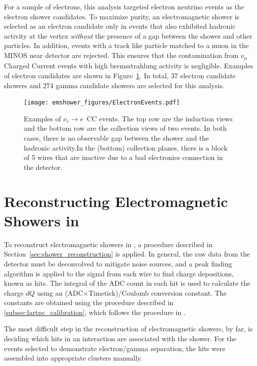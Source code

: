 For a sample of electrons, this analysis targeted electron neutrino events as the electron shower candidates.  To maximize purity, an electromagnetic shower is selected as an electron candidate only in events that also exhibited hadronic activity at the vertex {\em without} the presence of a gap between the shower and other particles.  In addition, events with a track like particle matched to a muon in the MINOS near detector are rejected.  This ensures that the contamination from $\nu_\mu$ Charged Current events with high bremsstrahlung activity is negligible.  Examples of electron candidates are shown in Figure~\ref{fig:electrons}. In total, 37 electron candidate showers and 274 gamma candidate showers are selected for this analysis.



\begin{figure}[ht]
\centering
\texttt{[image: emshower\_figures/ElectronEvents.pdf]}
\caption[Electron Candidate Events in \argoneut]{\label{fig:electrons} Examples of $\nu_e \rightarrow e$~CC events.  The top row are the induction views and the bottom row are the collection views of two events. In both cases, there is no observable gap between the shower and the hadronic activity.In the (bottom) collection planes, there is a block of 5 wires that are inactive due to a bad electronics connection in the detector.}
\end{figure}


\section{Reconstructing Electromagnetic Showers in \lartpcs}

To reconstruct electromagnetic showers in \lartpcs, a procedure described in Section~\ref{sec:shower_reconstruction} is applied.  In general, the raw data from the detector must be deconvolved to mitigate noise sources, and a peak finding algorithm is applied to the signal from each wire to find charge depositions, known as hits. The integral of the ADC count in each hit is used to calculate the charge $dQ$ using an (ADC$\times$Timetick)/Coulomb conversion constant.  The constants are obtained using the procedure described in \ref{subsec:lartpc_calibration}, which follows the procedure in \cite{Anderson:2012mra}.

The most difficult step in the reconstruction of electromagnetic showers, by far, is deciding which hits in an interaction are associated with the shower. For the events selected to demonstrate electron/gamma separation, the hits were assembled into appropriate clusters manually.

